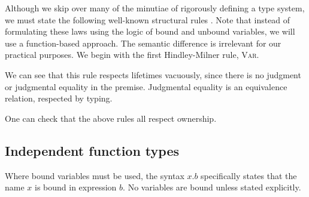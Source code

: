 \documentclass[UKenglish, 11pt, a4paper, parskip=half]{scrbook}
\begin{document}
Although we skip over many of the minutiae of rigorously defining a type system, we must state the following well-known structural rules \cite{hottbook}.
Note that instead of formulating these laws using the logic of bound and unbound variables, we will use a function-based approach.
The semantic difference is irrelevant for our practical purposes.
We begin with the first Hindley-Milner rule, \textsc{Var}.
\begin{mathpar}
\end{mathpar}
We can see that this rule respects lifetimes vacuously, since there is no judgment or judgmental equality in the premise.
Judgmental equality is an equivalence relation, respected by typing.
One can check that the above rules all respect ownership.

\subsection{Independent function types}

Where bound variables must be used, the syntax \( x.b \) specifically states that the name \( x \) is bound in expression \( b \).
No variables are bound unless stated explicitly.

\end{document}
